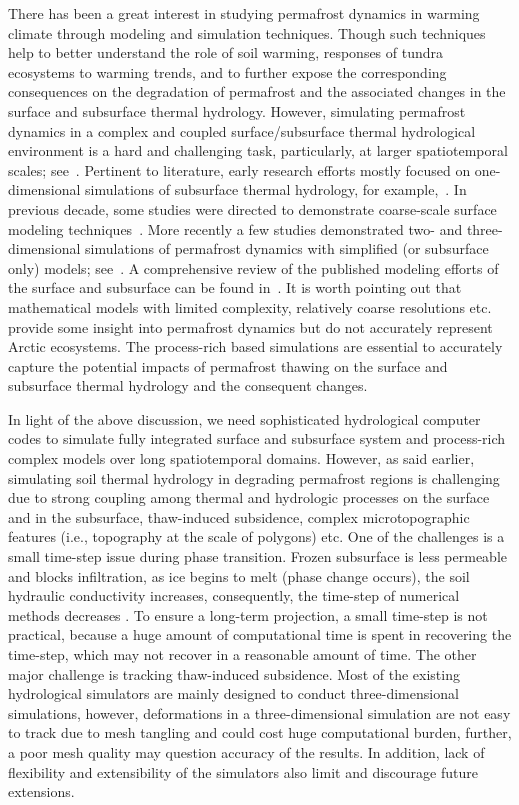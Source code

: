 \documentclass[review]{elsarticle}
\begin{document}
There has been a great interest in studying permafrost dynamics in warming climate through modeling and simulation techniques. Though such techniques help to better understand the role of soil warming, responses of tundra ecosystems to warming trends, and to further expose the corresponding consequences on the degradation of permafrost and the associated changes in the surface and subsurface thermal hydrology. However, simulating permafrost dynamics in a complex and coupled surface/subsurface thermal hydrological environment is a hard and challenging task, particularly, at larger spatiotemporal scales; see~\cite{painter2013modeling}. Pertinent to literature, early research efforts mostly focused on one-dimensional simulations of subsurface thermal hydrology, for example,~\cite{harlan1973analysis, guymon1974coupled, taylor1978model}. In previous decade, some studies were directed to demonstrate coarse-scale surface modeling techniques~\cite{takata2003development, nicolsky2007improved, mckenzie2007groundwater}. More recently a few studies demonstrated two- and three-dimensional simulations of permafrost dynamics with simplified (or subsurface only) models; see~\cite{bense2009evolution, lawrence2012simulation, koven2013analysis, karra2014three}. A comprehensive review of the published modeling efforts of the surface and subsurface can be found in~\cite{kurylyk2014climate}. It is worth pointing out that mathematical models with limited complexity, relatively coarse resolutions etc. provide some insight into permafrost dynamics but do not accurately represent Arctic ecosystems. The process-rich based simulations are essential to accurately capture the potential impacts of permafrost thawing on the surface and subsurface thermal hydrology and the consequent changes.

In light of the above discussion, we need sophisticated hydrological computer codes to simulate fully integrated surface and subsurface system and process-rich complex models over long spatiotemporal domains. However, as said earlier, simulating soil thermal hydrology in degrading permafrost regions is challenging due to strong coupling among thermal and hydrologic processes on the surface and in the subsurface, thaw-induced subsidence, complex microtopographic features (i.e., topography at the scale of polygons) etc. One of the challenges is a small time-step issue during phase transition. Frozen subsurface is less permeable and blocks infiltration, as ice begins to melt (phase change occurs), the soil hydraulic conductivity increases, consequently, the time-step of numerical methods decreases \cite{dall2011robust}. To ensure a long-term projection, a small time-step is not practical, because a huge amount of computational time is spent in recovering the time-step, which may not recover in a reasonable amount of time. The other major challenge is tracking thaw-induced subsidence. Most of the existing hydrological simulators are mainly designed to conduct three-dimensional simulations, however, deformations in a three-dimensional simulation are not easy to track due to mesh tangling and could cost huge computational burden, further, a poor mesh quality may question accuracy of the results. In addition, lack of flexibility and extensibility of the simulators also limit and discourage future extensions.
\end{document}
